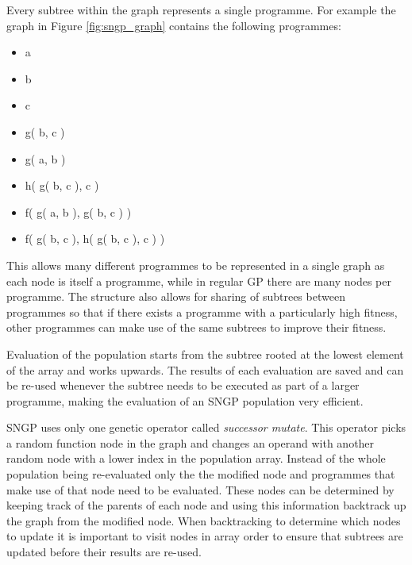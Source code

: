 \documentclass{article}
\begin{document}
        Every subtree within the graph represents a single programme. For example the graph in Figure \ref{fig:sngp_graph} contains the following programmes:
        
        \begin{multicols}{2}
            \begin{itemize}
                \item a
                \item b
                \item c
                \item g( b, c )
                \item g( a, b )
                \item h( g( b, c ), c )
                \item f( g( a, b ), g( b, c ) )
                \item f( g( b, c ), h( g( b, c ), c ) )
            \end{itemize}
        \end{multicols}
        
        This allows many different programmes to be represented in a single graph as each node is itself a programme, while in regular GP there are many nodes per programme. The structure also allows for sharing of subtrees between programmes so that if there exists a programme with a particularly high fitness, other programmes can make use of the same subtrees to improve their fitness.
        
        Evaluation of the population starts from the subtree rooted at the lowest element of the array and works upwards. The results of each evaluation are saved and can be re-used whenever the subtree needs to be executed as part of a larger programme, making the evaluation of an SNGP population very efficient.
        
        SNGP uses only one genetic operator called \textit{successor mutate}. This operator picks a random function node in the graph and changes an operand with another random node with a lower index in the population array. Instead of the whole population being re-evaluated only the the modified node and programmes that make use of that node need to be evaluated. These nodes can be determined by keeping track of the parents of each node and using this information backtrack up the graph from the modified node. When backtracking to determine which nodes to update it is important to visit nodes in array order to ensure that subtrees are updated before their results are re-used.
        
\end{document}
